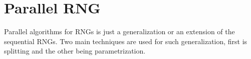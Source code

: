 \chapter{Parallel RNG}
Parallel algorithms for RNGs is just a generalization or 
an extension of the sequential RNGs. Two main techniques are 
used for such generalization, first is splitting and the other 
being parametrization.